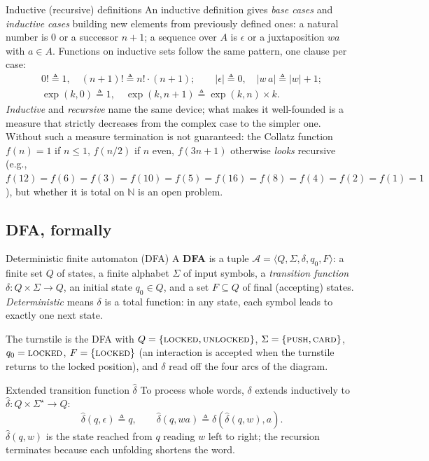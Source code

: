 \begin{definitionbox}{Inductive (recursive) definitions}
An inductive definition gives \emph{base cases} and \emph{inductive cases} building new elements from previously defined ones: a natural number is $0$ or a successor $n+1$; a sequence over $A$ is $\epsilon$ or a juxtaposition $wa$ with $a \in A$. Functions on inductive sets follow the same pattern, one clause per case:
\begin{gather*}
  0! \triangleq 1, \quad (n+1)! \triangleq n! \cdot (n+1); \qquad |\epsilon| \triangleq 0, \quad |w\,a| \triangleq |w| + 1; \\
  \exp(k,0) \triangleq 1, \quad \exp(k,n+1) \triangleq \exp(k,n) \times k.
\end{gather*}
\emph{Inductive} and \emph{recursive} name the same device; what makes it well-founded is a measure that strictly decreases from the complex case to the simpler one. Without such a measure termination is not guaranteed: the Collatz function $f(n) = 1$ if $n \leq 1$, $f(n/2)$ if $n$ even, $f(3n+1)$ otherwise \emph{looks} recursive (e.g.,\ $f(12) = f(6) = f(3) = f(10) = f(5) = f(16) = f(8) = f(4) = f(2) = f(1) = 1$), but whether it is total on $\mathbb{N}$ is an open problem.
\end{definitionbox}

\subsection{DFA, formally}

\begin{definitionbox}{Deterministic finite automaton (DFA)}
A \textbf{DFA} is a tuple $\mathcal{A} = \langle Q, \Sigma, \delta, q_0, F \rangle$: a finite set $Q$ of states, a finite alphabet $\Sigma$ of input symbols, a \emph{transition function} $\delta : Q \times \Sigma \to Q$, an initial state $q_0 \in Q$, and a set $F \subseteq Q$ of final (accepting) states. \emph{Deterministic} means $\delta$ is a total function: in any state, each symbol leads to exactly one next state.
\end{definitionbox}

The turnstile is the DFA with $Q = \{\textsc{locked}, \textsc{unlocked}\}$, $\Sigma = \{\textsc{push}, \textsc{card}\}$, $q_0 = \textsc{locked}$, $F = \{\textsc{locked}\}$ (an interaction is accepted when the turnstile returns to the locked position), and $\delta$ read off the four arcs of the diagram.

\begin{definitionbox}{Extended transition function $\hat{\delta}$}
To process whole words, $\delta$ extends inductively to $\hat{\delta} : Q \times \Sigma^\star \to Q$:
\[
  \hat{\delta}(q, \epsilon) \triangleq q, \qquad \hat{\delta}(q, wa) \triangleq \delta(\hat{\delta}(q, w), a).
\]
$\hat{\delta}(q, w)$ is the state reached from $q$ reading $w$ left to right; the recursion terminates because each unfolding shortens the word.
\end{definitionbox}

